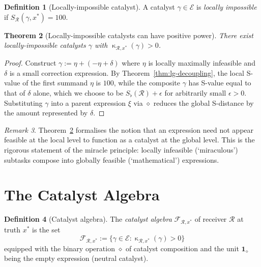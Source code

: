 \documentclass[twocolumn,11pt,a4paper]{article}
\theoremstyle{thmstyle}
\newtheorem{theorem}{Theorem}[section]
\theoremstyle{thmstyle}
\theoremstyle{definition}
\newtheorem{definition}[theorem]{Definition}
\theoremstyle{remark}
\newtheorem{remark}[theorem]{Remark}
\DeclareMathOperator{\catpow}{\kappa}
\newcommand{\Expr}{\mathcal{E}}
\newcommand{\receiver}{\mathcal{R}}
\newcommand{\Frame}{\mathcal{F}}
\newcommand{\Sscalar}{S}
\newcommand{\Sfloor}{S_{\flat}}
\begin{document}
\begin{definition}[Locally-impossible catalyst]
\label{def:loc-imp-cat}
A catalyst $\gamma \in \Expr$ is
\emph{locally impossible} if
$\Sscalar_{\receiver}(\gamma, x^{*}) = 100$.
\end{definition}

\begin{theorem}[Locally-impossible catalysts can have
positive power]\label{thm:loc-imp-positive}
There exist locally-impossible catalysts $\gamma$ with
$\catpow_{\receiver, x^{*}}(\gamma) > 0$.
\end{theorem}

\begin{proof}
Construct $\gamma := \eta + (-\eta + \delta)$ where
$\eta$ is locally maximally infeasible and
$\delta$ is a small correction expression.  By
Theorem~\ref{thm:lg-decoupling}, the local S-value of
the first summand $\eta$ is $100$, while the
composite $\gamma$ has S-value equal to that of
$\delta$ alone, which we choose to be
$\Sfloor(\receiver) + \epsilon$ for arbitrarily small
$\epsilon > 0$.  Substituting $\gamma$ into a parent
expression $\xi$ via $\diamond$ reduces the global
S-distance by the amount represented by $\delta$.
\end{proof}

\begin{remark}\label{rem:miracle-as-catalyst}
Theorem~\ref{thm:loc-imp-positive} formalises the
notion that an expression need not appear feasible
at the local level to function as a catalyst at the
global level.  This is the rigorous statement of the
miracle principle: locally infeasible (`miraculous')
subtasks compose into globally feasible (`mathematical')
expressions.
\end{remark}

\section{The Catalyst Algebra}
\label{sec:catalyst-algebra}

\begin{definition}[Catalyst algebra]\label{def:cat-algebra}
The \emph{catalyst algebra} $\Frame_{\receiver, x^{*}}$
of receiver $\receiver$ at truth $x^{*}$ is the set
\[
\Frame_{\receiver, x^{*}}
:= \{\gamma \in \Expr : \catpow_{\receiver, x^{*}}(\gamma) > 0\}
\]
equipped with the binary operation $\diamond$ of
catalyst composition and the unit
$\mathbf{1}_{\diamond}$ being the empty expression
(neutral catalyst).
\end{definition}
\end{document}
